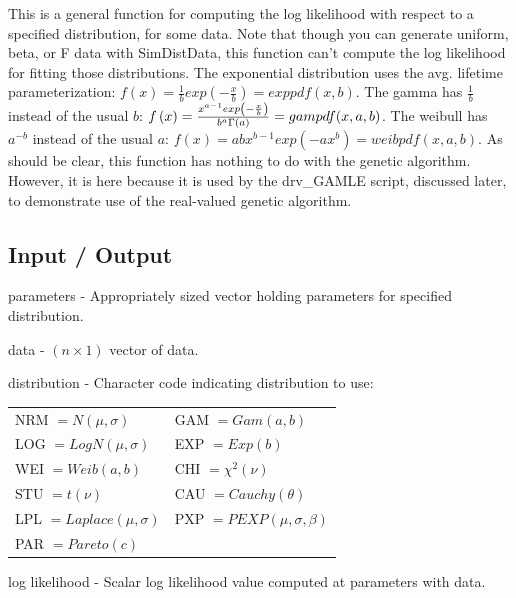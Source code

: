 \documentclass{book}
\newcommand{\textcode}[1]{\textsf{\small #1}}   %
\begin{document}
This is a general function for computing the log likelihood with
respect to a specified distribution, for some data. Note that though
you can generate uniform, beta, or F data with
\textcode{SimDistData}, this function can't compute the log
likelihood for fitting those distributions. The exponential
distribution uses the avg. lifetime parameterization: $f\left(
x\right) =\frac{1}{b}exp\left( -\frac{x}{b}\right) =exppdf(x,b)$.
The gamma
has $\frac{1}{b}$ instead of the usual $b$: $f\left( x\right) =\frac{%
x^{a-1}exp\left( -\frac{x}{b}\right) }{b^{a}\Gamma \left( a\right) }%
=gampdf(x,a,b)$. The weibull has $a^{-b}$ instead of the usual $a$:
$f\left( x\right) =abx^{b-1}exp(-ax^{b})=weibpdf(x,a,b)$. As should
be clear, this function has nothing to do with the genetic
algorithm. However, it is here because it is used by the
\textcode{drv\_GAMLE} script, discussed later, to demonstrate use of
the real-valued genetic algorithm.

\subsection*{Input / Output}

\begin{compactitem}

\item \textcode{parameters} - Appropriately sized vector holding parameters for specified distribution.

\item \textcode{data} - $\left( n \times 1 \right)$ vector of data.

\item \textcode{distribution} - Character code indicating distribution to use:

\begin{tabular}{ll}
NRM $=N\left( \mu ,\sigma \right)$ & GAM $=Gam\left( a,b\right)$ \\
LOG $=LogN\left( \mu ,\sigma \right)$ & EXP $=Exp\left( b\right)$ \\
WEI $=Weib\left( a,b\right)$ & CHI $=\chi ^{2}\left( \nu \right)$ \\
STU $=t\left( \nu \right)$ & CAU $=Cauchy\left( \theta \right)$ \\
LPL $=Laplace\left( \mu ,\sigma \right)$ & PXP $=PEXP\left( \mu ,\sigma,\beta \right)$ \\
PAR $=Pareto\left( c\right)$
\end{tabular}

\item \textcode{log likelihood} - Scalar log likelihood value computed at \textcode{parameters} with \textcode{data}.

\end{compactitem}
\end{document}
